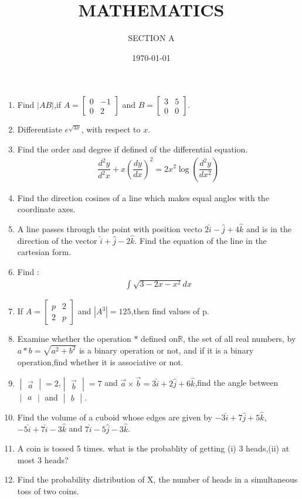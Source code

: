 \documentclass[2pt,-letter paper]{article}
\title{MATHEMATICS}
\author{SECTION A}
\date{\today}
\providecommand{\mydet}[1]{\ensuremath{\begin{vmatrix}#1\end{vmatrix}}}
\providecommand{\myvec}[1]{\ensuremath{\begin{bmatrix}#1\end{bmatrix}}}
\providecommand{\brak}[1]{\ensuremath{\left(#1\right)}}
\begin{document}
\maketitle

\begin{enumerate}
\item Find $|AB|$,if $A = \myvec{0 & -1 \\ 0 & 2}$ and $B = \myvec{3 & 5 \\ 0 & 0}$.
\item Differentiate $e^{\sqrt{3x}}$, with respect to ${x}$.
\item Find the order and degree if defined of the differential equation. 
\begin{align*}
 \dfrac{d^2y}{d^2x}+x\brak{\dfrac{dy}{dx}}^2=2x^2\log\brak{\dfrac{d^2y}{dx^2}}
\end{align*}
\item Find the direction cosines of a line which makes equal angles with the coordinate axes.
\item A line passes through the point with position vecto $2\hat{i} - \hat{j} + 4\hat{k}$ and is in the direction of the vector $\hat{i} + \hat{j} -2\hat{k}.$ Find the equation of the line in the cartesian form.
\item Find :
\begin{align*}
 \int{\sqrt{3 - 2x - x^2}}{dx}
\end{align*}
\item If $A = \myvec{p & 2 \\ 2 & p}$ and $|A^3| = 125$,then find values of p.
\item Examine whether the operation $\ast$ defined on$ \mathbb{R}$, the set of all real numbers, by ${a} \ast {b} = {\sqrt{a^2 + b^2}}$ is a binary operation or not, and if it is a binary operation,find whether it is associative or not.
\item $\mydet{\overrightarrow{a}}= 2$,$\mydet{\overrightarrow{b}} = 7$ and  $\overrightarrow{a} \times \overrightarrow{b} = 3\hat{i} + 2\hat{j} + 6\hat{k}$,find the angle between $\mydet{a}$ and $\mydet{b}$.
\item Find the volume of a cuboid whose edges are given by $-3\hat{i} + 7\hat{j} + 5\hat{k}$, $-5\hat{i} + 7\hat{i} - 3\hat{k}$ and $7\hat{i} -5\hat{j} -3\hat{k}$.
\item A coin is tossed 5 times. what is the probablity of getting ({i}) 3 heads,({ii}) at most 3 heads?
\item Find the probability distribution of X, the number of heads in a simultaneous toss of two coins.

\end{enumerate}
\end{document}
